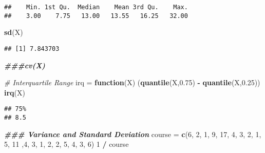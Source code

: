 \documentclass[
]{article}
\newenvironment{Shaded}{\begin{snugshade}}{\end{snugshade}}
\newcommand{\CommentTok}[1]{\textcolor[rgb]{0.56,0.35,0.01}{\textit{#1}}}
\newcommand{\ControlFlowTok}[1]{\textcolor[rgb]{0.13,0.29,0.53}{\textbf{#1}}}
\newcommand{\DecValTok}[1]{\textcolor[rgb]{0.00,0.00,0.81}{#1}}
\newcommand{\DocumentationTok}[1]{\textcolor[rgb]{0.56,0.35,0.01}{\textbf{\textit{#1}}}}
\newcommand{\FloatTok}[1]{\textcolor[rgb]{0.00,0.00,0.81}{#1}}
\newcommand{\FunctionTok}[1]{\textcolor[rgb]{0.13,0.29,0.53}{\textbf{#1}}}
\newcommand{\NormalTok}[1]{#1}
\newcommand{\OtherTok}[1]{\textcolor[rgb]{0.56,0.35,0.01}{#1}}
\newcommand{\SpecialCharTok}[1]{\textcolor[rgb]{0.81,0.36,0.00}{\textbf{#1}}}
\begin{document}
\begin{verbatim}
##    Min. 1st Qu.  Median    Mean 3rd Qu.    Max. 
##    3.00    7.75   13.00   13.55   16.25   32.00
\end{verbatim}

\begin{Shaded}
\begin{Highlighting}[]
\FunctionTok{sd}\NormalTok{(X)}
\end{Highlighting}
\end{Shaded}

\begin{verbatim}
## [1] 7.843703
\end{verbatim}

\begin{Shaded}
\begin{Highlighting}[]
\DocumentationTok{\#\#\#cv(X)}
\end{Highlighting}
\end{Shaded}

\begin{Shaded}
\begin{Highlighting}[]
\CommentTok{\# Interquartile Range}
\NormalTok{irq }\OtherTok{=} \ControlFlowTok{function}\NormalTok{(X) (}\FunctionTok{quantile}\NormalTok{(X,}\FloatTok{0.75}\NormalTok{) }\SpecialCharTok{{-}} \FunctionTok{quantile}\NormalTok{(X,}\FloatTok{0.25}\NormalTok{))}
\FunctionTok{irq}\NormalTok{(X)}
\end{Highlighting}
\end{Shaded}

\begin{verbatim}
## 75% 
## 8.5
\end{verbatim}

\begin{Shaded}
\begin{Highlighting}[]
\DocumentationTok{\#\#\# Variance and Standard Deviation}
\NormalTok{course }\OtherTok{=} \FunctionTok{c}\NormalTok{(}\DecValTok{6}\NormalTok{, }\DecValTok{2}\NormalTok{, }\DecValTok{1}\NormalTok{, }\DecValTok{9}\NormalTok{, }\DecValTok{17}\NormalTok{, }\DecValTok{4}\NormalTok{, }\DecValTok{3}\NormalTok{, }\DecValTok{2}\NormalTok{, }\DecValTok{1}\NormalTok{, }\DecValTok{5}\NormalTok{, }\DecValTok{11}\NormalTok{ ,}\DecValTok{4}\NormalTok{, }\DecValTok{3}\NormalTok{, }\DecValTok{1}\NormalTok{, }\DecValTok{2}\NormalTok{, }\DecValTok{2}\NormalTok{, }\DecValTok{5}\NormalTok{, }\DecValTok{4}\NormalTok{, }\DecValTok{3}\NormalTok{, }\DecValTok{6}\NormalTok{)}
\DecValTok{1} \SpecialCharTok{/}\NormalTok{ course }
\end{Highlighting}
\end{Shaded}
\end{document}
